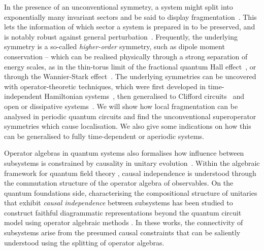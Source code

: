 \documentclass[11pt, twocolumn, floatfix, superscriptaddress, aps, prb, raggedbottom]{revtex4-2}
\newcommand\chris[1]{\textcolor{blue}{\textbf{#1}}}
\begin{document}
In the presence of an unconventional symmetry, a system might split into exponentially many invariant sectors and be said to display fragmentation~\cite {Moudgalya2022review}.
This lets the information of which sector a system is prepared in to be preserved, and is notably robust against general perturbation~\cite{Stephen2024, Kovacs2026}.
Frequently, the underlying symmetry is a so-called \emph{higher-order} symmetry, such as dipole moment conservation -- which can be realised physically through a strong separation of energy scales, as in the thin-torus limit of the fractional quantum Hall effect~\cite {Zerba2025}, or through the Wannier-Stark effect~\cite{Schulz2019, vanNieuwenburg2019}.
The underlying symmetries can be uncovered with operator-theoretic techniques, which were first developed in time-independent Hamiltonian systems~\cite{Moudgalya2022}, then generalised to Clifford circuits~\cite{Kovacs2026} and open or dissipative systems~\cite{YahuiLi2023_OpenHSF, paszko2025operatorspacefragmentationintegrabilitypaulilindblad, Paszko2024_OpenSPT}.
We will show how local fragmentation can be analysed in periodic quantum circuits and find the unconventional superoperator symmetries which cause localisation.
We also give some indications on how this can be generalised to fully time-dependent or aperiodic systems.

Operator algebras in quantum systems also formalises how influence between subsystems is constrained by causality in unitary evolution~\cite{Allen2017}.
Within the algebraic framework for quantum field theory \cite{Fewster2019, Haag1996, BuchholzFredenhagen2023, BrunettiEtAl2015}, causal independence is understood through the commutation structure of the operator algebra of observables.
On the quantum foundations side, characterising the compositional structure of unitaries that exhibit \textit{causal independence} between subsystems has been studied to construct faithful diagrammatic representations beyond the quantum circuit model using operator algebraic methods \cite{Lorenz2021, Ormrod2023}.
In these works, the connectivity of subsystems arise from the presumed causal constraints that can be saliently understood using the splitting of operator algebras.
\end{document}
